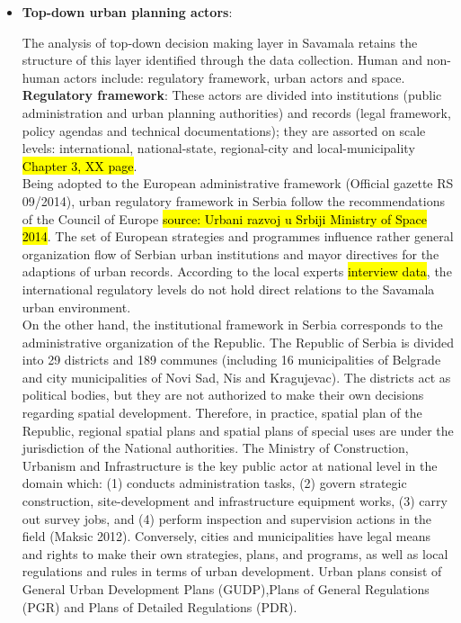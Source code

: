 \documentclass[11pt]{report}
\begin{document}
\begin{itemize}
\item \textbf{Top-down urban planning actors}:

The analysis of top-down decision making layer in Savamala retains the structure of this layer identified through the data collection. Human and non-human actors include: regulatory framework, urban actors and space.
\\
\textbf{Regulatory framework}: 
These actors are divided into institutions (public administration and urban planning authorities) and records (legal framework, policy agendas and technical documentations); they are assorted on scale levels: international, national-state, regional-city and local-municipality \hl{Chapter 3, XX page}. 
\\
Being adopted to the European administrative framework (Official gazette RS 09/2014), urban regulatory framework in Serbia follow the recommendations of the Council of Europe \hl{source: Urbani razvoj u Srbiji Ministry of Space 2014}. The set of European strategies and programmes influence rather general organization flow of Serbian urban institutions and mayor directives for the adaptions of urban records. According to the local experts \hl{interview data}, the international regulatory levels do not hold direct relations to the Savamala urban environment.
\\
On the other hand, the institutional framework in Serbia corresponds to the administrative organization of the Republic.
The Republic of Serbia is divided into 29 districts and 189 communes (including 16 municipalities of Belgrade and city municipalities of Novi Sad, Nis and Kragujevac). The districts act as political bodies, but they are not authorized to make their own decisions regarding spatial development. Therefore, in practice, spatial plan of the Republic, regional spatial plans and spatial plans of special uses are under the jurisdiction of the National authorities. 
The Ministry of Construction, Urbanism and Infrastructure is the key public actor at national level in the domain which: (1) conducts administration tasks, (2) govern strategic construction, site-development and infrastructure equipment works, (3) carry out survey jobs, and (4) perform inspection and supervision actions in the field (Maksic 2012).
Conversely, cities and municipalities have legal means and rights to make their own strategies, plans, and programs, as well as local regulations and rules in terms of urban development.
Urban plans consist of General Urban Development Plans (GUDP),\footnotemark Plans of General Regulations (PGR) and Plans of Detailed Regulations (PDR). \footnotemark

\end{itemize}
\end{document}
